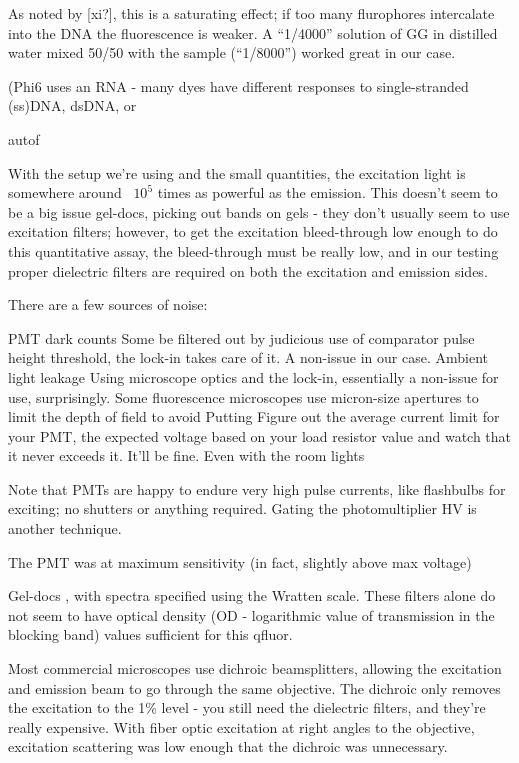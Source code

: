 \documentclass[paper.tex]{subfiles}
\begin{document}
As noted by [xi?], this is a saturating effect; if too many flurophores intercalate into the DNA the fluorescence is weaker. A “1/4000” solution of GG in distilled water mixed 50/50 with the sample (“1/8000”) worked great in our case.

(Phi6 uses an RNA - many dyes have different responses to single-stranded (ss)DNA, dsDNA, or 


autof


With the setup we’re using and the small quantities, the excitation light is somewhere around ~$10^5$ times as powerful as the emission. This doesn’t seem to be a big issue gel-docs, picking out bands on gels - they don’t usually seem to use excitation filters; however, to get the excitation bleed-through low enough to do this quantitative assay, the bleed-through must be really low, and in our testing proper dielectric filters are required on both the excitation and emission sides. 

There are a few sources of noise:

PMT dark counts
Some be filtered out by judicious use of comparator pulse height threshold, the lock-in takes care of it. A non-issue in our case.
Ambient light leakage
Using microscope optics and the lock-in, essentially a non-issue for use, surprisingly. Some fluorescence microscopes use micron-size apertures to limit the depth of field to avoid Putting 
Figure out the average current limit for your PMT, the expected voltage based on your load resistor value and watch that it never exceeds it. It’ll be fine. Even with the room lights


Note that PMTs are happy to endure very high pulse currents, like flashbulbs for exciting; no shutters or anything required. Gating the photomultiplier HV is another technique.


The PMT was at maximum sensitivity (in fact, slightly above max voltage)

Gel-docs , with spectra specified using the Wratten scale. These filters alone do not seem to have optical density (OD - logarithmic value of transmission in the blocking band) values sufficient for this qfluor. 

Most commercial microscopes use dichroic beamsplitters, allowing the excitation and emission beam to go through the same objective. The dichroic only removes the excitation to the 1\% level - you still need the dielectric filters, and they’re really expensive. With fiber optic excitation at right angles to the objective, excitation scattering was low enough that the dichroic was unnecessary. 
\end{document}
